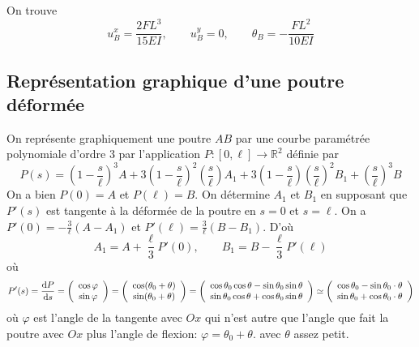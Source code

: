 \documentclass[a4paper]{article}
\def \de {{\rm d}}
\begin{document}
 
%	
%		
 
 On trouve 
 \[u_B^x=\frac{2FL^3}{15EI},\qquad u_B^y=0,\qquad \theta_B=-\frac{FL^2}{10EI}\]
 
\subsection*{Représentation graphique d'une poutre déformée }
On représente graphiquement une poutre $AB$ par une courbe paramétrée polynomiale d'ordre 3 par l'application $P:[0,\ell]\to \mathbb{R}^2$ définie par 
\[P(s)=\left(1-\frac s{\ell}\right)^3A+3\left(1-\frac s{\ell}\right)^2\left(\frac s{\ell}\right)A_1+3\left(1-\frac s{\ell}\right)\left(\frac s{\ell}\right)^2B_1+\left(\frac s{\ell}\right)^3B\]
On a bien $P(0)=A$ et $P(\ell)=B$. On détermine $A_1$ et $B_1$ en supposant que $P'(s)$ est tangente à la déformée de la poutre en $s=0$ et $s=\ell$. On a $P'(0)=-\frac 3{\ell}\left(A-A_1\right)$ et $P'(\ell)=\frac 3{\ell}\left(B-B_1\right)$. D'où
\[ A_1=A+\frac{\ell}{3}P'(0),  \qquad B_1=B-\frac{\ell}{3}P'(\ell)\]
où
\[P'(s)=\frac{\de P}{\de s}=\left(\begin{array}{c}
\cos\varphi \\ \sin\varphi
\end{array}\right)=\left(\begin{array}{c}
\cos(\theta_0+\theta) \\ \sin(\theta_0+\theta)
\end{array}\right)=\left(\begin{array}{c}
\cos\theta_0\cos\theta-\sin\theta_0\sin\theta \\ \sin\theta_0\cos\theta+\cos\theta_0\sin\theta
\end{array}\right)\simeq \left(\begin{array}{c}
\cos\theta_0-\sin\theta_0\cdot\theta \\ \sin\theta_0+\cos\theta_0\cdot\theta
\end{array}\right)\]
où $\varphi$ est l'angle de la tangente avec $Ox$ qui n'est autre que l'angle que fait la poutre avec $Ox$ plus l'angle de flexion: $\varphi=\theta_0+\theta$. avec $\theta $ assez petit.


 
\end{document}
